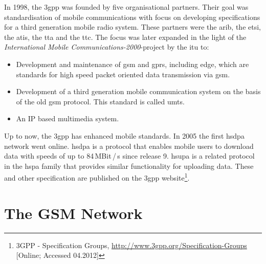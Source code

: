 In 1998, the \gls{3gpp} was founded by five organisational partners.
Their goal was standardisation of mobile communications with focus on developing specifications for a third generation mobile radio system.
These partners were the \gls{arib}, the \gls{etsi}, the \gls{atis}, the \gls{tta} and the \gls{ttc}.
The focus was later expanded in the light of the \emph{International Mobile Communications-2000}-project \cite{3gpp_Proposal2000} by the \gls{itu} to:
\begin{itemize}
	\item Development and maintenance of \gls{gsm} and \gls{gprs}, including \gls{edge}, which are standards for high speed packet oriented data transmission via \gls{gsm}.
	\item Development of a third generation mobile communication system on the basis of the old \gls{gsm} protocol. This standard is called \gls{umts}.
	\item An IP based multimedia system.
\end{itemize}
Up to now, the \gls{3gpp} has enhanced mobile standards.
In 2005 the first \gls{hsdpa} network went online.
\gls{hsdpa} \cite{hsdpa} is a protocol that enables mobile users to download data with speeds of up to 84\,MBit\,/\,s since release 9.
\gls{hsupa} \cite{hsupa} is a related protocol in the \gls{hspa} family that provides similar functionality for uploading data.
These and other specification are published on the \gls{3gpp} website\footnote{3GPP - Specification Groups, \url{http://www.3gpp.org/Specification-Groups} [Online; Accessed 04.2012]}.

\section{The GSM Network}
\label{sec:network}

